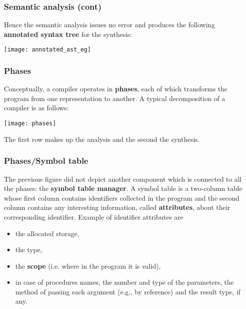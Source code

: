 % 
\begin{frame}
\frametitle{Semantic analysis (cont)}

\label{annotated_ast_eg}

Hence the semantic analysis issues no error and produces the following
\textbf{annotated syntax tree} for the synthesis:
\begin{center}
\texttt{[image: annotated\_ast\_eg]}
\end{center}

\end{frame}

% 
\begin{frame}
\frametitle{Phases}

\label{phases}

Conceptually, a compiler operates in \textbf{phases}, each of which
transforms the program from one representation to another. A typical
decomposition of a compiler is as follows:
\begin{center}
\texttt{[image: phases]}
\end{center}
The first row makes up the analysis and the second the synthesis.
\end{frame}

% 
\begin{frame}
\frametitle{Phases/Symbol table}

The previous figure did not depict another component which is
connected to all the phases: the \textbf{symbol table manager}. A
symbol table is a two-column table whose first column contains
identifiers collected in the program and the second column contains
any interesting information, called \textbf{attributes}, about their
corresponding identifier. Example of identifier attributes are
\begin{itemize}
  \item the allocated storage,

  \item the type, 

  \item the \textbf{scope} (i.e. where in the program it is valid),

  \item in case of procedures names, the number and type of the
  parameters, the method of passing each argument (e.g., by reference)
  and the result type, if any.

\end{itemize}

\end{frame}

